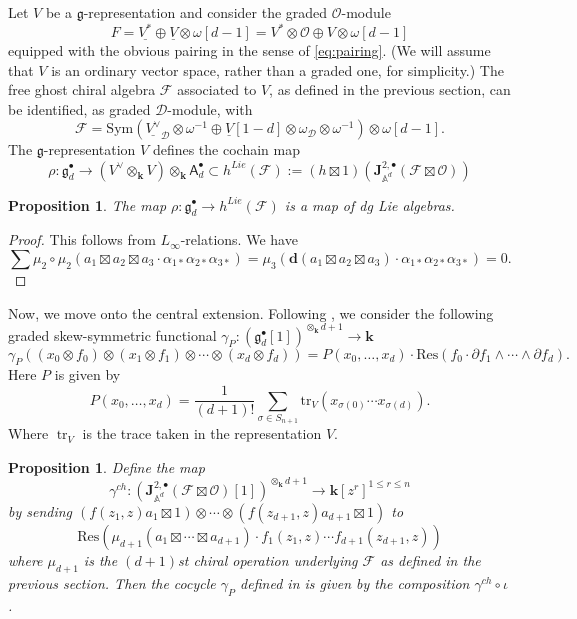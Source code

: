 \documentclass[11pt]{amsart}
\newtheorem{prop}[thm]{Proposition}
\theoremstyle{definition}
\theoremstyle{remark}
\numberwithin{equation}{section}
\newcommand{\op}{\operatorname}
\begin{document}
Let $V$ be a $\mathfrak{g}$-representation and consider the graded $\mathcal{O}$-module 
\[
  F = \underline{V^*} \oplus \underline{V} \otimes
\omega [d-1] = V^* \otimes \mathcal{O}\oplus V \otimes \omega [d-1]
\]
equipped with the obvious pairing in the sense of \eqref{eq:pairing}.
(We will assume that $V$ is an ordinary vector space, rather than a graded one, for simplicity.)
The free ghost chiral algebra $\mathcal{F}$ associated to $V$, as defined in the previous section, can be identified,
as graded $\mathcal{D}$-module, with
$$
\mathcal{F}=\mathrm{Sym}(\underline{V^{\vee}}_{\mathcal{D}}\otimes\omega^{-1}\oplus \underline{V} [1-d]\otimes\omega_{\mathcal{D}}\otimes\omega^{-1})\otimes\omega[d-1].
$$
The $\mathfrak{g}$-representation $V$ defines the cochain map 
$$
\rho \colon \mathfrak{g}_d^{\bullet}\rightarrow (V^{\vee}\otimes_{\mathbf{k}} V)\otimes_{\mathbf{k}} \mathsf{A}
_d^{\bullet}\subset h^{Lie}(\mathcal{F}):=(h\boxtimes 1)\left(\mathbf{J}^{2,\bullet}_{\mathbb{A}^d}(\mathcal{F}\boxtimes \mathcal{O})\right)
$$


\begin{prop}
    The map $\rho \colon \mathfrak{g}^{\bullet}_d\rightarrow h^{Lie}(\mathcal{F})$ is a map of dg Lie algebras.
\end{prop}
\begin{proof}
    This follows from $L_\infty$-relations. We have
    $$
    \sum \mu_2\circ \mu_2\left(a_1\boxtimes a_2\boxtimes a_3\cdot \alpha_{1\ast}\alpha_{2\ast}\alpha_{3\ast}\right)=\mu_3\left(\mathbf{d}(a_1\boxtimes a_2\boxtimes a_3)\cdot \alpha_{1\ast}\alpha_{2\ast}\alpha_{3\ast}\right)=0.
    $$
\end{proof}

Now, we move onto the central extension.
Following \cite{FHK}, we consider the following graded skew-symmetric functional $\gamma_P:\left(\mathfrak{g}_d^{\bullet}[1]\right)^{\otimes_{\mathbf{k}}d+1}\rightarrow \mathbf{k}$
$$
\gamma_P\left((x_0\otimes f_0)\otimes(x_1\otimes f_1)\otimes \cdots \otimes (x_d\otimes f_d) \right)=P(x_0,\dots,x_d)\cdot \mathrm{Res}\left(f_0\cdot \partial f_1\wedge\cdots \wedge \partial f_d\right).
$$
Here $P$ is given by
$$
P(x_0,\dots,x_{d})=\frac{1}{(d+1)!}\sum_{\sigma\in S_{n+1}}\mathrm{tr}_V\left(x_{\sigma(0)}\cdots x_{\sigma(d)}\right).
$$
Where $\op{tr}_V$ is the trace taken in the representation $V$.

\begin{prop}
    Define the map
    $$
\gamma^{ch}:\left(\mathbf{J}^{2,\bullet}_{\mathbb{A}^d}(\mathcal{F}\boxtimes \mathcal{O})[1]\right)^{\otimes_{\mathbf{k}} d+1}\rightarrow \mathbf{k}[z^r]^{1\leq r\leq n}
    $$
    by sending $\left(f(z_1,z)a_1\boxtimes 1\right)\otimes\cdots \otimes \left(f(z_{d+1},z)a_{d+1}\boxtimes 1\right) $ to    $$\mathrm{Res}\left(\mu_{d+1}(a_1\boxtimes\cdots \boxtimes a_{d+1})\cdot f_1(z_1,z)\cdots f_{d+1}(z_{d+1},z)\right)
    $$
    where $\mu_{d+1}$ is the $(d+1)$st chiral operation underlying $\mathcal{F}$ as defined in the previous section.
    Then the cocycle $\gamma_P$ defined in \cite{FHK} is given by the composition $\gamma^{ch}\circ\iota$.
\end{prop}
\end{document}
